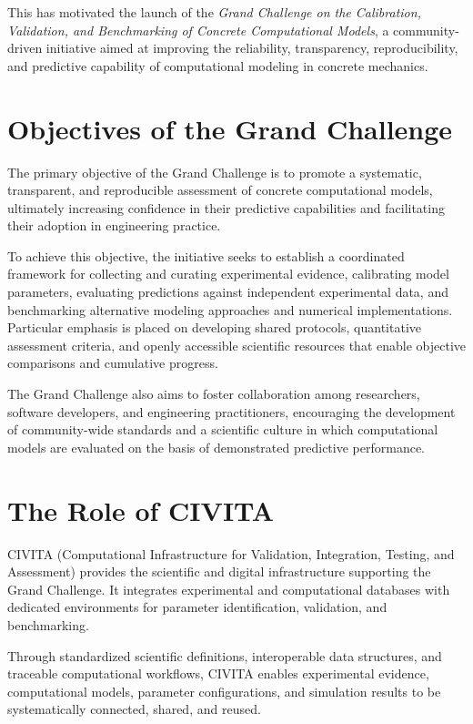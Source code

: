 This has motivated the launch of the \textit{Grand Challenge on the Calibration, Validation, and Benchmarking of Concrete Computational Models}, a community-driven initiative aimed at improving the reliability, transparency, reproducibility, and predictive capability of computational modeling in concrete mechanics.



\section{Objectives of the Grand Challenge}

The primary objective of the Grand Challenge is to promote a systematic, transparent, and reproducible assessment of concrete computational models, ultimately increasing confidence in their predictive capabilities and facilitating their adoption in engineering practice.

To achieve this objective, the initiative seeks to establish a coordinated framework for collecting and curating experimental evidence, calibrating model parameters, evaluating predictions against independent experimental data, and benchmarking alternative modeling approaches and numerical implementations. Particular emphasis is placed on developing shared protocols, quantitative assessment criteria, and openly accessible scientific resources that enable objective comparisons and cumulative progress.

The Grand Challenge also aims to foster collaboration among researchers, software developers, and engineering practitioners, encouraging the development of community-wide standards and a scientific culture in which computational models are evaluated on the basis of demonstrated predictive performance.

\section{The Role of CIVITA}

CIVITA (Computational Infrastructure for Validation, Integration, Testing, and Assessment) provides the scientific and digital infrastructure supporting the Grand Challenge. It integrates experimental and computational databases with dedicated environments for parameter identification, validation, and benchmarking.

Through standardized scientific definitions, interoperable data structures, and traceable computational workflows, CIVITA enables experimental evidence, computational models, parameter configurations, and simulation results to be systematically connected, shared, and reused.


